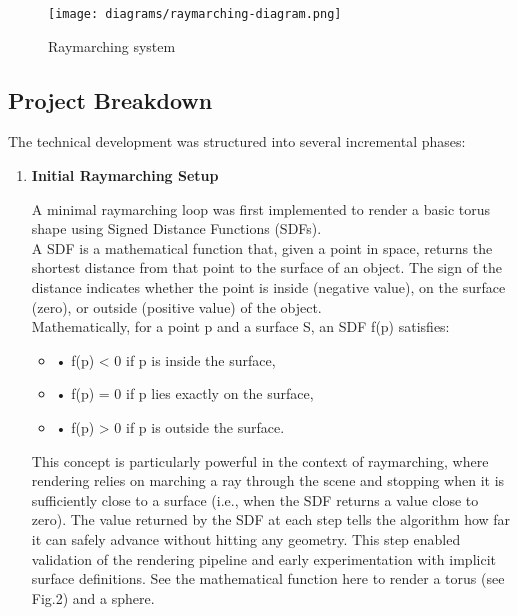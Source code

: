 \documentclass{rapportcs}
\begin{document}
    \begin{figure}[H]
        \centering
        \texttt{[image: diagrams/raymarching-diagram.png]}
        \caption{Raymarching system}
        \label{fig:label_image}
    \end{figure}

\newpage


\subsection{Project Breakdown}
    
    The technical development was structured into several incremental phases:\\

    \begin{enumerate}
    
      \item \textbf{Initial Raymarching Setup}
      
        A minimal raymarching loop was first implemented to render a basic torus shape using Signed Distance Functions (SDFs). \\
        
        \noindent A SDF is a mathematical function that, given a point in space, returns the shortest distance from that point to the surface of an object. The sign of the distance indicates whether the point is inside (negative value), on the surface (zero), or outside (positive value) of the object.\\
        Mathematically, for a point p and a surface S, an SDF f(p) satisfies:

        \begin{itemize}
            \item[\hspace{1cm}] • f(p) < 0 if p is inside the surface,
            \item[\hspace{1cm}] • f(p) = 0 if p lies exactly on the surface,
            \item[\hspace{1cm}] • f(p) > 0 if p is outside the surface.\\
        \end{itemize}

        \noindent This concept is particularly powerful in the context of raymarching, where rendering relies on marching a ray through the scene and stopping when it is sufficiently close to a surface (i.e., when the SDF returns a value close to zero). The value returned by the SDF at each step tells the algorithm how far it can safely advance without hitting any geometry.
        This step enabled validation of the rendering pipeline and early experimentation with implicit surface definitions. See the mathematical function here to render a torus (see Fig.2) and a sphere.\\


\end{enumerate}
\end{document}
